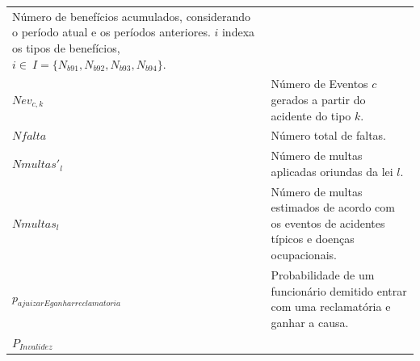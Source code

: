 \documentclass[]{article}
\begin{document}
\begin{longtable}[]{@{}ll@{}}
\begin{minipage}[t]{0.87\columnwidth}
Número de benefícios acumulados, considerando o período atual e os
períodos anteriores. \(i\) indexa os tipos de benefícios,
\(i \in \ I =\{N_{b91}, N_{b92}, N_{b93}, N_{b94}\}\).\strut
\end{minipage}\tabularnewline
\begin{minipage}[t]{0.07\columnwidth}\raggedright\strut
\(Nev_{c,k}\)\strut
\end{minipage} & \begin{minipage}[t]{0.87\columnwidth}\raggedright\strut
Número de Eventos \(c\) gerados a partir do acidente do tipo
\(k\).\strut
\end{minipage}\tabularnewline
\begin{minipage}[t]{0.07\columnwidth}\raggedright\strut
\(Nfalta\)\strut
\end{minipage} & \begin{minipage}[t]{0.87\columnwidth}\raggedright\strut
Número total de faltas.\strut
\end{minipage}\tabularnewline
\begin{minipage}[t]{0.07\columnwidth}\raggedright\strut
\(Nmultas'_{l}\)\strut
\end{minipage} & \begin{minipage}[t]{0.87\columnwidth}\raggedright\strut
Número de multas aplicadas oriundas da lei \(l\).\strut
\end{minipage}\tabularnewline
\begin{minipage}[t]{0.07\columnwidth}\raggedright\strut
\(Nmultas_{l}\)\strut
\end{minipage} & \begin{minipage}[t]{0.87\columnwidth}\raggedright\strut
Número de multas estimados de acordo com os eventos de acidentes típicos
e doenças ocupacionais.\strut
\end{minipage}\tabularnewline
\begin{minipage}[t]{0.07\columnwidth}\raggedright\strut
\(p_{ajuizarEganharreclamatoria}\)\strut
\end{minipage} & \begin{minipage}[t]{0.87\columnwidth}\raggedright\strut
Probabilidade de um funcionário demitido entrar com uma reclamatória e
ganhar a causa.\strut
\end{minipage}\tabularnewline
\begin{minipage}[t]{0.07\columnwidth}\raggedright\strut
\(P_{Invalidez}\)\strut
\end{minipage} & \begin{minipage}[t]{0.87\columnwidth}\raggedright\strut

\end{minipage}
\end{longtable}
\end{document}
